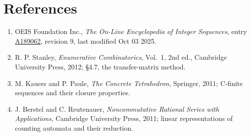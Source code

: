 \documentclass[11pt]{article}
\theoremstyle{definition}
\begin{document}
\section{References}

\begin{enumerate}

\item OEIS Foundation Inc., \emph{The On-Line Encyclopedia of Integer Sequences}, entry \href{https://oeis.org/A189062}{A189062}, revision 9, last modified Oct 03 2025.

\item R. P. Stanley, \emph{Enumerative Combinatorics}, Vol.~1, 2nd ed., Cambridge University Press, 2012; \S4.7, the transfer-matrix method.

\item M. Kauers and P. Paule, \emph{The Concrete Tetrahedron}, Springer, 2011; C-finite sequences and their closure properties.

\item J. Berstel and C. Reutenauer, \emph{Noncommutative Rational Series with Applications}, Cambridge University Press, 2011; linear representations of counting automata and their reduction.

\end{enumerate}
\end{document}
